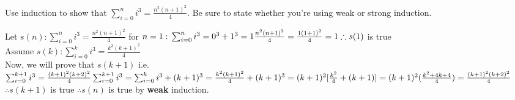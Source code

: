 \documentclass[11pt]{amsart}
\newcommand{\ee}{\end{enumerate}}
\begin{document}


\item Use induction to show that $\sum_{i=0}^n i^3= \frac{n^2(n+1)^2}{4}$.
Be sure to state whether you're using weak or strong induction.
	
	\begin{sol}
		Let $s(n): \sum_{i=0}^n i^3 = \frac{n^2(n+1)^2}{4}$
		for $n=1:\\
		\sum_{i=0}^n i^3 = 0^3 + 1^3 = 1\\
		\frac{n^2(n+1)^2}{4} = \frac{1(1+1)^2}{4} = 1\\
		\therefore s(1)$ is true\\
		Assume $s(k): \sum_{i=0}^k i^3 = \frac{k^2(k+1)^2}{4}$\\
		Now, we will prove that $s(k+1)$ i.e. $\sum_{i=0}^{k+1} i^3 = \frac{(k+1)^2(k+2)^2}{4}\\
		\sum_{i=0}^{k+1} i^3 = \sum_{i=0}^k i^3 + (k+1)^3\\
		= \frac{k^2(k+1)^2}{4} + (k+1)^3\\
		= (k+1)^2 [\frac{k^2}{4} + (k+1)]\\
		= (k+1)^2 (\frac{k^2 + 4k + 4}{4})\\
		= \frac{(k+1)^2(k+2)^2}{4}$\\
		$\therefore s(k+1)$ is true $\therefore s(n)$ is true by \textbf{weak} induction.
	\end{sol}
\end{document}

